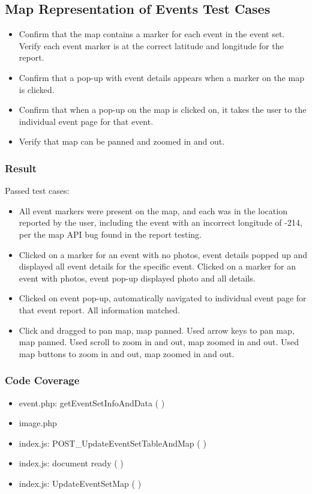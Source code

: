 \subsection{Map Representation of Events Test Cases}
\begin{itemize}
\item Confirm that the map contains a marker for each event in the event set. Verify each event marker is at the correct latitude and longitude for the report.
\item Confirm that a pop-up with event details appears when a marker on the map is clicked. 
\item Confirm that when a pop-up on the map is clicked on, it takes the user to the individual event page for that event.
\item Verify that map can be panned and zoomed in and out.
\end{itemize}
\subsubsection{Result}
Passed test cases:
\begin{itemize}
\item All event markers were present on the map, and each was in the location reported by the user, including the event with an incorrect longitude of -214, per the map API bug found in the report testing.
\item Clicked on a marker for an event with no photos, event details popped up and displayed all event details for the specific event. Clicked on a marker for an event with photos, event pop-up displayed photo and all details. 
\item Clicked on event pop-up, automatically navigated to individual event page for that event report. All information matched.
\item Click and dragged to pan map, map panned. Used arrow keys to pan map, map panned. Used scroll to zoom in and out, map zoomed in and out. Used map buttons to zoom in and out, map zoomed in and out.
\end{itemize}
\subsubsection{Code Coverage}
\begin{itemize}
\item event.php: getEventSetInfoAndData ( )
\item image.php
\item index.js: POST\_UpdateEventSetTableAndMap ( )
\item index.js: document ready ( )
\item index.js: UpdateEventSetMap ( )
\end{itemize}
